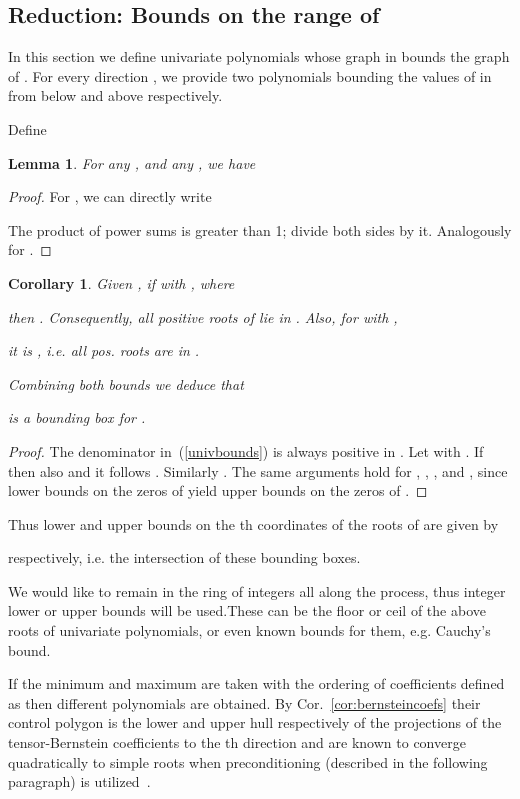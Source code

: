 \documentclass{sig-alternate}
\newtheorem{lemma}[theorem]{Lemma}
\newtheorem{corollary}[theorem]{Corollary}
\begin{document}
\subsection{Reduction: Bounds on the range of {}}  \label{subsec:reduction}

In this section we define univariate polynomials whose graph in
 bounds the graph of . For every direction , we provide
two polynomials bounding the values of  in  from
below and above respectively.

Define


\begin{lemma} \label{u_bounds}
  For any ,  and any , we have

\end{lemma}
\begin{proof}
For , we can directly write

The product of power sums is greater than 1; divide both sides by it. Analogously for .
\end{proof}

\begin{corollary} \label{cbounds}
Given , if  with ,
where 
 
then . Consequently, all positive roots of  lie in
. Also, for  with ,
 
it is , i.e. all pos. roots are in .

Combining both bounds we deduce that 
 
is a bounding box for .
\end{corollary}
\begin{proof}
  The denominator in~(\ref{univbounds}) is always positive in
  . Let  with . If
   then also  and it follows . Similarly . The same arguments hold for ,
  , ,
  and , since lower bounds on the zeros of  yield upper
  bounds on the zeros of .
\end{proof}

Thus lower and upper bounds on the th coordinates of the roots of
 are given by 

respectively, i.e. the intersection of these bounding boxes.

We would like to remain in the ring of integers all along the process,
thus integer lower or upper bounds will be used.These can be the
floor or ceil of the above roots of univariate polynomials, or even
known bounds for them, e.g. Cauchy's bound.

If the minimum and maximum are taken with the ordering of coefficients
defined as  then different  polynomials are obtained. By Cor.~\ref{cor:bernsteincoefs}
their control polygon is the lower and upper hull respectively of the
projections of the tensor-Bernstein coefficients to the th
direction and are known to converge quadratically to simple roots when
preconditioning (described in the following paragraph)
is utilized~\cite[Cor.~5.3]{mp:smspe-05}.\\
\end{document}
